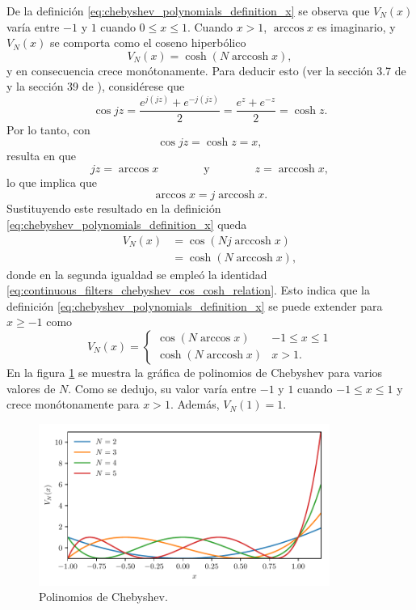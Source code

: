 \documentclass[a4paper]{report}
\DeclareMathOperator{\arccosh}{arccosh}
\begin{document}
De la definición \ref{eq:chebyshev_polynomials_definition_x} se observa que \(V_N(x)\) varía entre \(-1\) y \(1\) cuando \(0\leq x\leq 1\). Cuando \(x>1\), \(\arccos x\) es imaginario, y \(V_N(x)\) se comporta como el coseno hiperbólico
\[
 V_N(x)=\cosh(N\arccosh x),
\]
y en consecuencia crece monótonamente. Para deducir esto (ver la sección 3.7 de \cite{daniels1974approximation} y la sección 39 de \cite{brown2013complex}), considérese que 
\begin{equation}\label{eq:continuous_filters_chebyshev_cos_cosh_relation}
 \cos jz=\frac{e^{j(jz)}+e^{-j(jz)}}{2}=\frac{e^{z}+e^{-z}}{2}=\cosh z. 
\end{equation}
Por lo tanto, con 
\[
 \cos jz=\cosh z=x,
\]
resulta en que 
\[
 jz=\arccos x
 \qquad\qquad\textrm{y}\qquad\qquad
 z=\arccosh x,
\]
lo que implica que
\begin{equation}\label{eq:continuous_filters_chebyshev_acos_acosh_relation}
 \arccos x=j\arccosh x. 
\end{equation}
Sustituyendo este resultado en la definición \ref{eq:chebyshev_polynomials_definition_x} queda
\begin{align*}
 V_N(x)&=\cos(Nj\arccosh x)\\
  &=\cosh(N\arccosh x),
\end{align*}
donde en la segunda igualdad se empleó la identidad \ref{eq:continuous_filters_chebyshev_cos_cosh_relation}. Esto indica que la definición \ref{eq:chebyshev_polynomials_definition_x} se puede extender para \(x\geq-1\) como
\begin{equation}\label{eq:chebyshev_polynomials_definition_x_etended}
 V_N(x)=
 \left\{ 
  \begin{array}{ll}
   \cos(N\arccos x) & -1\leq x\leq 1\\
   \cosh(N\arccosh x) & x>1.
  \end{array}
 \right.
\end{equation}
En la figura \ref{fig:continuous_filters_chebyshev_polynomials} se muestra la gráfica de polinomios de Chebyshev para varios valores de \(N\). Como se dedujo, su valor varía entre \(-1\) y \(1\) cuando \(-1\leq x\leq1\) y crece monótonamente para \(x>1\). Además, \(V_N(1)=1\).
\begin{figure}[!htb]
 \begin{center}
 \includegraphics[width=0.85\textwidth]{figuras/continuous_filters_chebyshev_polynomials.pdf}
 \caption{\label{fig:continuous_filters_chebyshev_polynomials} Polinomios de Chebyshev.}
 \end{center}
\end{figure}
\end{document}
